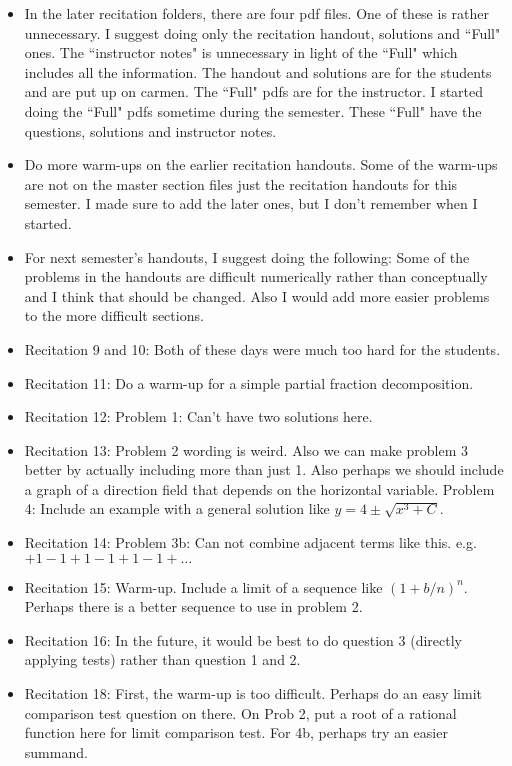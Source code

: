 \documentclass{article}
\begin{document}
\large

\begin{itemize}
\item In the later recitation folders, there are four pdf files. One of these is rather unnecessary. I suggest doing only the recitation handout, solutions and ``Full" ones. The ``instructor notes" is unnecessary in light of the ``Full" which includes all the information. The handout and solutions are for the students and are put up on carmen. The ``Full" pdfs are for the instructor. I started doing the ``Full" pdfs sometime during the semester. These ``Full" have the questions, solutions and instructor notes. 
\item Do more warm-ups on the earlier recitation handouts. Some of the warm-ups are not on the master section files just the recitation handouts for this semester. I made sure to add the later ones, but I don't remember when I started.
\item For next semester's handouts, I suggest doing the following: Some of the problems in the handouts are difficult numerically rather than conceptually and I think that should be changed. Also I would add more easier problems to the more difficult sections. 
\item Recitation 9 and 10: Both of these days were much too hard for the students. 
\item Recitation 11: Do a warm-up for a simple partial fraction decomposition.
\item Recitation 12: Problem 1: Can't have two solutions here.
\item Recitation 13: Problem 2 wording is weird. Also we can make problem 3 better by actually including more than just 1. Also perhaps we should include a graph of a direction field that depends on the horizontal variable. Problem 4: Include an example with a general solution like $y=4\pm \sqrt{x^3+C}$. 
\item Recitation 14: Problem 3b: Can not combine adjacent terms like this. e.g. $+1-1+1-1+1-1+\ldots$
\item Recitation 15: Warm-up. Include a limit of a sequence like $(1+b/n)^n$. Perhaps there is a better sequence to use in problem 2.
\item Recitation 16: In the future, it would be best to do question 3 (directly applying tests) rather than question 1 and 2.
\item Recitation 18: First, the warm-up is too difficult. Perhaps do an easy limit comparison test question on there. On Prob 2, put a root of a rational function here for limit comparison test. For 4b, perhaps try an easier summand. 

\end{itemize}
\end{document}
